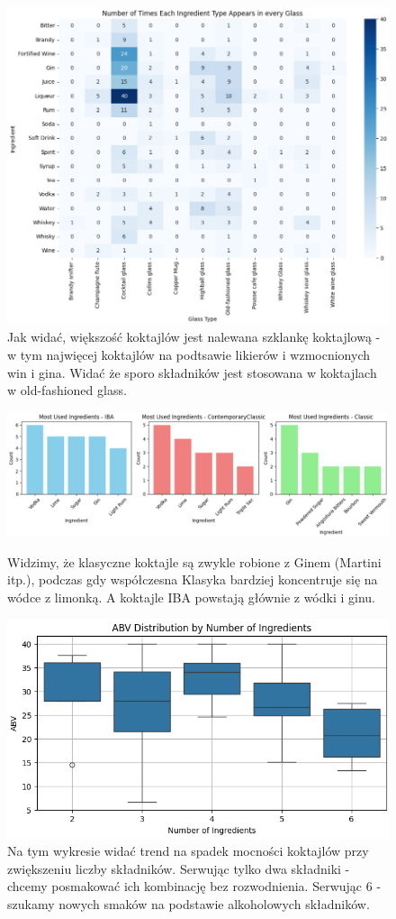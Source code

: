 \documentclass{article}
\begin{document}
\begin{figure}[h]
\centering
    \includegraphics[width=0.7\linewidth]{c_i_p_3.png}
    \caption{Jak widać, większość koktajlów jest nalewana szklankę koktajlową - w tym najwięcej koktajlów na podtsawie likierów i wzmocnionych win i gina. Widać że sporo składników jest stosowana w koktajlach w old-fashioned glass.}
\end{figure}


\begin{figure}[h]
\centering
    \includegraphics[width=1\linewidth]{c_i_p_4.png}
    \caption{Widzimy, że klasyczne koktajle są zwykle robione z Ginem (Martini itp.), podczas gdy współczesna Klasyka bardziej koncentruje się na wódce z limonką. A koktajle IBA powstają głównie z wódki i ginu.}
    \vspace{2cm}
    \includegraphics[width=0.8\linewidth]{c_i_p_5.png}
    \caption{Na tym wykresie widać trend na spadek mocności koktajlów przy zwiększeniu liczby składników. Serwując tylko dwa składniki - chcemy posmakować ich kombinację bez rozwodnienia. Serwując 6 - szukamy nowych smaków na podstawie alkoholowych składników.}
\end{figure}
\end{document}
